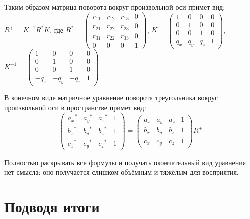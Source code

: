\documentclass [12pt, a4paper] {article}
\begin{document}
Таким образом матрица поворота вокруг произвольной оси примет вид: $R^+ = K^{-1} R^* K$, где $R^* = \begin {pmatrix}
	r_{11} & r_{12} & r_{13} & 0 \\
	r_{21} & r_{22} & r_{23} & 0 \\
	r_{31} & r_{22} & r_{33} & 0 \\
	0 & 0 & 0 & 1
\end {pmatrix}$, $K = \begin {pmatrix}
	1 & 0 & 0 & 0 \\
	0 & 1 & 0 & 0 \\
	0 & 0 & 1 & 0 \\
	q_x & q_y & q_z & 1
\end {pmatrix}$, $K^{-1} = \begin {pmatrix}
	1 & 0 & 0 & 0 \\
	0 & 1 & 0 & 0 \\
	0 & 0 & 1 & 0 \\
	-q_x & -q_y & -q_z & 1
\end {pmatrix}$

В конечном виде матричное уравнение поворота треугольника вокруг произвольной оси в пространстве примет вид:
\begin {equation} \label{eq:rotate}
	\begin {pmatrix}
		{a_x}^* & {a_y}^* & {a_z}^* & 1 \\
		{b_x}^* & {b_y}^* & {b_z}^* & 1 \\
		{c_x}^* & {c_y}^* & {c_z}^* & 1
	\end {pmatrix} = \begin {pmatrix}
		a_x & a_y & a_z & 1 \\
		b_x & b_y & b_z & 1 \\
		c_x & c_y & c_z & 1
	\end {pmatrix} R^+
\end {equation}

Полностью раскрывать все формулы и получать окончательный вид уравнения нет смысла: оно получается слишком объёмным и тяжёлым для восприятия.

\section {Подводя итоги}
\end{document}
